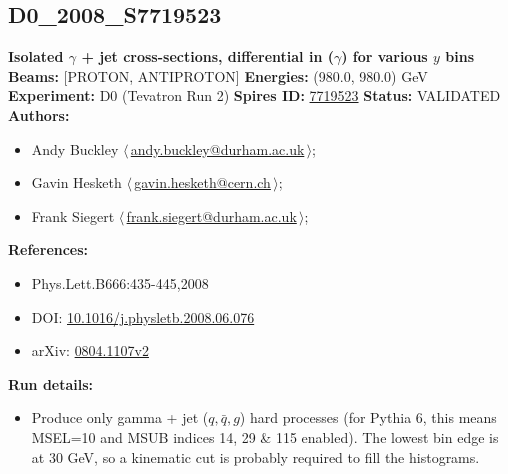 \subsection[D0\_2008\_S7719523]{D0\_2008\_S7719523\,\cite{Abazov:2008er}}
\textbf{Isolated $\gamma$ + jet cross-sections, differential in \pT($\gamma$) for various $y$ bins}\newline
\textbf{Beams:} [PROTON, ANTIPROTON] \newline
\textbf{Energies:} (980.0, 980.0) GeV \newline
\textbf{Experiment:} D0 (Tevatron Run 2) \newline
\textbf{Spires ID:} \href{http://www.slac.stanford.edu/spires/find/hep/www?rawcmd=key+7719523}{7719523}\newline
\textbf{Status:} VALIDATED\newline
\textbf{Authors:}
\begin{itemize}
  \item Andy Buckley $\langle\,$\href{mailto:andy.buckley@durham.ac.uk}{andy.buckley@durham.ac.uk}$\,\rangle$;
  \item Gavin Hesketh $\langle\,$\href{mailto:gavin.hesketh@cern.ch}{gavin.hesketh@cern.ch}$\,\rangle$;
  \item Frank Siegert $\langle\,$\href{mailto:frank.siegert@durham.ac.uk}{frank.siegert@durham.ac.uk}$\,\rangle$;
\end{itemize}
\textbf{References:}
\begin{itemize}
  \item Phys.Lett.B666:435-445,2008
  \item DOI: \href{http://dx.doi.org/10.1016/j.physletb.2008.06.076}{10.1016/j.physletb.2008.06.076}
  \item arXiv: \href{http://arxiv.org/abs/0804.1107v2}{0804.1107v2}
\end{itemize}
\textbf{Run details:}
\begin{itemize}

  \item Produce only gamma + jet ($q,\bar{q},g$) hard processes (for Pythia 6, this means MSEL=10 and MSUB indices 14, 29 \& 115 enabled). The lowest bin edge is at 30 GeV, so a kinematic \pTmin cut is probably required to fill the histograms.\end{itemize}

